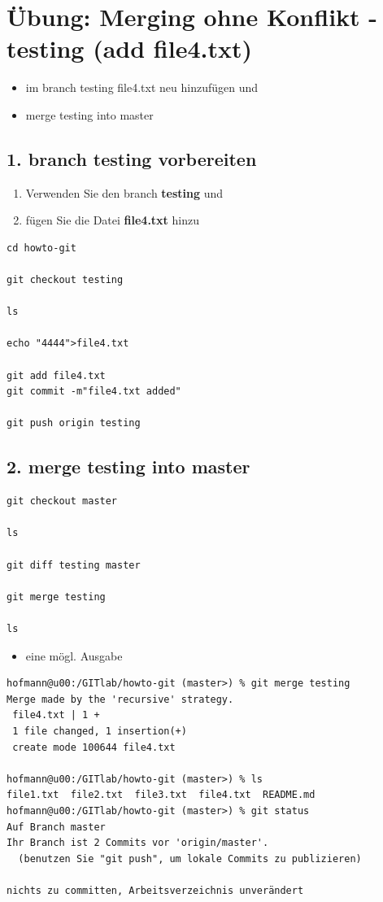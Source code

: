 \documentclass[11pt]{article}
\begin{document}
\section{Übung: Merging ohne Konflikt - testing (add file4.txt)}
\label{sec:org172d32c}

\begin{itemize}
\item im branch testing file4.txt neu hinzufügen und
\item merge testing into master
\end{itemize}


\subsection{1. branch testing vorbereiten}
\label{sec:orga9e8ea1}
\begin{enumerate}
\item Verwenden Sie den branch \textbf{testing} und
\item fügen Sie die Datei \textbf{file4.txt} hinzu
\end{enumerate}


\begin{verbatim}
cd howto-git

git checkout testing

ls

echo "4444">file4.txt

git add file4.txt
git commit -m"file4.txt added"

git push origin testing
\end{verbatim}

\subsection{2. merge testing into master}
\label{sec:orgadd04c8}

\begin{verbatim}
git checkout master

ls

git diff testing master

git merge testing

ls

\end{verbatim}


\begin{itemize}
\item eine mögl. Ausgabe
\end{itemize}

\begin{verbatim}
hofmann@u00:/GITlab/howto-git (master>) % git merge testing  
Merge made by the 'recursive' strategy.
 file4.txt | 1 +
 1 file changed, 1 insertion(+)
 create mode 100644 file4.txt

hofmann@u00:/GITlab/howto-git (master>) % ls
file1.txt  file2.txt  file3.txt  file4.txt  README.md
hofmann@u00:/GITlab/howto-git (master>) % git status
Auf Branch master
Ihr Branch ist 2 Commits vor 'origin/master'.
  (benutzen Sie "git push", um lokale Commits zu publizieren)

nichts zu committen, Arbeitsverzeichnis unverändert

\end{verbatim}
\end{document}
